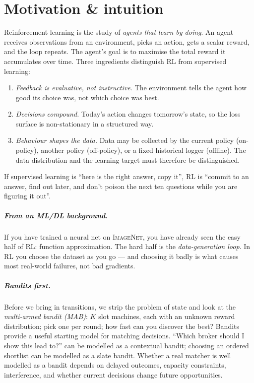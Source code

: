 \documentclass[11pt,oneside]{scrbook}
\begin{document}
\chapter{Motivation \& intuition}
\label{ch:motivation}

%
Reinforcement learning is the study of \emph{agents that learn by doing}. An
agent receives observations from an environment, picks an action, gets a scalar
reward, and the loop repeats. The agent's goal is to maximise the total reward
it accumulates over time. Three ingredients distinguish RL from supervised
learning:

\begin{enumerate}\setlength\itemsep{2pt}
  \item \emph{Feedback is evaluative, not instructive.} The environment tells
        the agent how good its choice was, not which choice was best.
  \item \emph{Decisions compound.} Today's action changes tomorrow's state, so
        the loss surface is non-stationary in a structured way.
  \item \emph{Behaviour shapes the data.} Data may be collected by the current
        policy (on-policy), another policy (off-policy), or a fixed historical
        logger (offline). The data distribution and the learning target must
        therefore be distinguished.
\end{enumerate}

\begin{intuition}
If supervised learning is ``here is the right answer, copy it'', RL is
``commit to an answer, find out later, and don't poison the next ten questions
while you are figuring it out''.
\end{intuition}

\paragraph{From an ML/DL background.} If you have trained a neural net on
\textsc{ImageNet}, you have already seen the easy half of RL: function
approximation. The hard half is the \emph{data-generation loop}. In RL you
choose the dataset as you go --- and choosing it badly is what causes most
real-world failures, not bad gradients.

\paragraph{Bandits first.} Before we bring in transitions, we strip the
problem of state and look at the \emph{multi-armed bandit (MAB)}: $K$ slot
machines, each with an unknown reward distribution; pick one per round; how
fast can you discover the best? Bandits provide a useful starting model for
matching decisions. ``Which broker should I show this lead to?'' can be
modelled as a contextual bandit; choosing an ordered shortlist can be
modelled as a slate bandit. Whether a real matcher is well
modelled as a bandit depends on delayed outcomes, capacity constraints,
interference, and whether current decisions change future opportunities.
\end{document}
